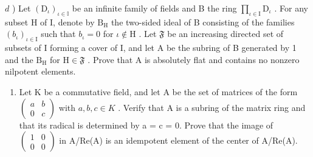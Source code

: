 \(d\) ) Let \((\mathrm{D}_{\iota})_{\iota \in \mathbb{I}}\) be an infinite family of fields and B the ring \(\prod_{\iota \in \mathrm{I}}\mathrm{D}_{\iota}\) . For any subset H of I, denote by \(\mathrm{B_H}\) the two-sided ideal of B consisting of the families \((b_{\iota})_{\iota \in \mathrm{I}}\) such that \(b_{\iota} = 0\) for \(\iota \notin \mathrm{H}\) . Let \(\mathfrak{F}\) be an increasing directed set of subsets of I forming a cover of I, and let A be the subring of B generated by 1 and the \(\mathrm{B_H}\) for \(\mathrm{H}\in \mathfrak{F}\) . Prove that A is absolutely flat and contains no nonzero nilpotent elements.

\begin{enumerate}
\def\labelenumi{\arabic{enumi})}
\setcounter{enumi}{30}
\tightlist
\item
  Let K be a commutative field, and let A be the set of matrices of the form \(\begin{pmatrix} a & b \\ 0 & c \end{pmatrix}\) with \(a, b, c \in K\) . Verify that A is a subring of the matrix ring and that its radical is determined by a = c = 0. Prove that the image of \(\begin{pmatrix} 1 & 0 \\ 0 & 0 \end{pmatrix}\) in A/Re(A) is an idempotent element of the center of A/Re(A).
\end{enumerate}

